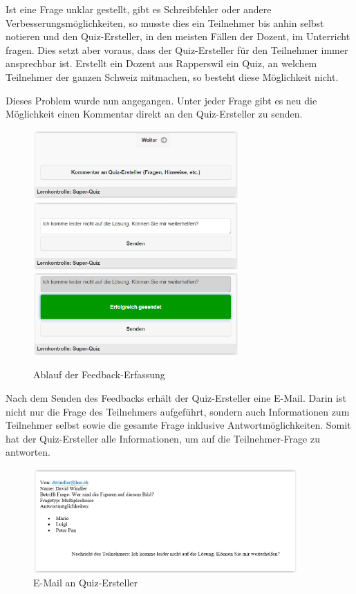 Ist eine Frage unklar gestellt, gibt es Schreibfehler oder andere Verbesserungsmöglichkeiten, so musste dies ein Teilnehmer bis anhin selbst notieren und den Quiz-Ersteller, in den meisten Fällen der Dozent, im Unterricht fragen. Dies setzt aber voraus, dass der Quiz-Ersteller für den Teilnehmer immer ansprechbar ist. Erstellt ein Dozent aus Rapperswil ein Quiz, an welchem Teilnehmer der ganzen Schweiz mitmachen, so besteht diese Möglichkeit nicht.

Dieses Problem wurde nun angegangen. Unter jeder Frage gibt es neu die Möglichkeit einen Kommentar direkt an den Quiz-Ersteller zu senden.

\begin{figure}[H]
	\centering
	\includegraphics[width=0.7\textwidth]{Images/Feedback-Button.PNG}
	\includegraphics[width=0.7\textwidth]{Images/Feedback-Frage.PNG}
	\includegraphics[width=0.7\textwidth]{Images/Feedback-Frage-gesendet.PNG}
	\caption{Ablauf der Feedback-Erfassung}
\end{figure}


Nach dem Senden des Feedbacks erhält der Quiz-Ersteller eine E-Mail. Darin ist nicht nur die Frage des Teilnehmers aufgeführt, sondern auch Informationen zum Teilnehmer selbst sowie die gesamte Frage inklusive Antwortmöglichkeiten. Somit hat der Quiz-Ersteller alle Informationen, um auf die Teilnehmer-Frage zu antworten.

\begin{figure}[H]
	\centering
	\includegraphics[width=0.9\textwidth]{Images/Feedback-Mail_Quiz-Ersteller.PNG}
	\caption{E-Mail an Quiz-Ersteller}
\end{figure}

